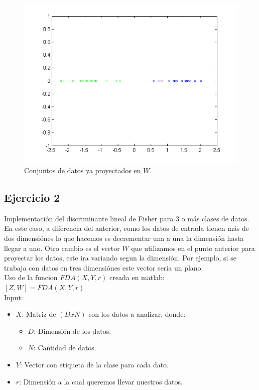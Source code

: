 \begin{figure}[ht!]
\centering
\includegraphics[width=120mm]{img/tp4/ej1-2.png}
\caption{Conjuntos de datos ya proyectados en $W$.}
\end{figure}

\subsection{Ejercicio 2}

Implementación del discriminante lineal de Fisher para 3 o más clases de datos. En este caso, a diferencia del anterior, como los datos de entrada tienen más de dos dimensiónes lo que hacemos es decrementar una a una la dimensión hasta llegar a uno. Otro cambio es el vector $W$ que utilizamos en el punto anterior para proyectar los datos, este ira variando segun la dimensión. Por ejemplo, si se trabaja con datos en tres dimensiónes este vector seria un plano.\\


Uso de la funcion $FDA(X,Y,r)$ creada en matlab:\\

$[Z,W]=FDA(X,Y,r)$\\

Input:
	\begin{itemize}
	\item$X$: Matriz de $(DxN)$ con los datos a analizar, donde:\\
		\begin{itemize}
		\item$D$: Dimensión de los datos.\\
		\item$N$: Cantidad de datos. \\
		\end{itemize}
	\item$Y$: Vector con etiqueta de la clase para cada dato.\\
	\item$r$: Dimensión a la cual queremos llevar nuestros datos.\\
	\end{itemize}
   
